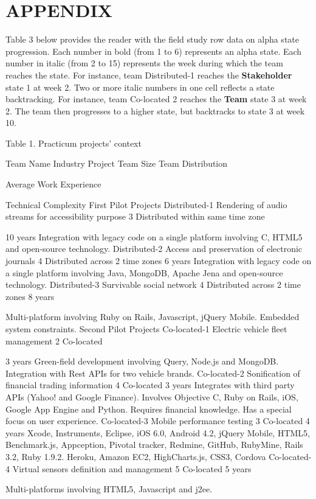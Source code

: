 \section{APPENDIX}
Table 3 below provides the reader with the field study row data on alpha state progression. Each number in bold (from 1 to 6) represents an alpha state. Each number in italic (from 2 to 15) represents the week during which the team reaches the state. For instance, team Distributed-1 reaches the \textbf{Stakeholder} state 1 at week 2. Two or more italic numbers in one cell reflects a state backtracking. For instance, team Co-located 2 reaches the \textbf{Team} state 3 at week 2. The team then progresses to a higher state, but backtracks to state 3 at week 10.






Table 1. Practicum projects' context

Team Name
Industry Project
Team Size
Team Distribution
 
Average Work Experience
 
 
 
Technical Complexity
First Pilot Projects
Distributed-1
Rendering of audio streams for accessibility purpose
3
Distributed within same time zone
 
10 years
Integration with legacy code on a single platform involving C, HTML5 and open-source technology.
Distributed-2
Access and preservation of electronic journals
4
Distributed across
2 time zones
6 years
Integration with legacy code on a single platform involving Java, MongoDB, Apache Jena and open-source technology.
Distributed-3
Survivable social network
4
Distributed across
2 time zones
8 years
 
Multi-platform involving Ruby on Rails, Javascript, jQuery Mobile. Embedded system constraints.
Second Pilot Projects
Co-located-1
Electric vehicle fleet management
2
Co-located
 
 
3 years
Green-field development involving Query, Node.js and MongoDB. Integration with Rest APIs for two vehicle brands.
Co-located-2
Sonification of financial trading information
4
Co-located
3 years
Integrates with third party APIs (Yahoo! and Google Finance). Involves Objective C, Ruby on Rails, iOS, Google App Engine and Python. Requires financial knowledge. Has a special focus on user experience.
Co-located-3
Mobile performance testing
3
Co-located
4 years
Xcode, Instruments, Eclipse, iOS 6.0, Android 4.2, jQuery Mobile, HTML5, Benchmark.js, Appception, Pivotal tracker, Redmine, GitHub, RubyMine, Rails 3.2, Ruby 1.9.2. Heroku, Amazon EC2, HighCharts.js, CSS3, Cordova
Co-located-4
Virtual sensors definition and management
5
Co-located
5 years
 
Multi-platforms involving HTML5, Javascript and j2ee.